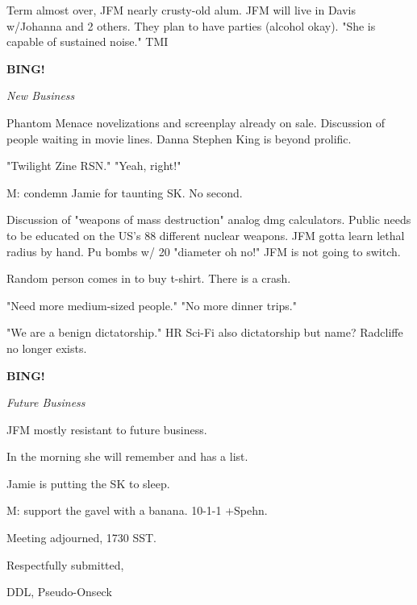 \documentclass[12pt]{article}
\newcommand{\bing}{{\bf BING!} }
\newcommand{\goto}[1]{\bing \vskip 12pt \centerline{{\em{#1}}}}
\begin{document}
Term almost over, JFM nearly crusty-old alum.
JFM will live in Davis w/Johanna and 2 others.
They plan to have parties (alcohol okay).
"She is capable of sustained noise." TMI

\goto{New Business}

Phantom Menace novelizations and screenplay already on sale.
Discussion of people waiting in movie lines.
Danna Stephen King is beyond prolific.

"Twilight Zine RSN." "Yeah, right!"

M: condemn Jamie for taunting SK. No second.

Discussion of "weapons of mass destruction" analog dmg calculators.
Public needs to be educated on the US's 88 different nuclear weapons.
JFM gotta learn lethal radius by hand.
Pu bombs w/ 20 "diameter oh no!" JFM is not going to switch.

Random person comes in to buy t-shirt. There is a crash.

"Need more medium-sized people." "No more dinner trips."

"We are a benign dictatorship." HR Sci-Fi also dictatorship but name? Radcliffe no longer exists.

\goto{Future Business}

JFM mostly resistant to future business.

In the morning she will remember and has a list.

Jamie is putting the SK to sleep.

M: support the gavel with a banana. 10-1-1 +Spehn.

\vspace{12pt}

\noindent
Meeting adjourned, 1730 SST.

\vspace{18pt}

\centerline{Respectfully submitted,}
\centerline{DDL, Pseudo-Onseck}
\end{document}
